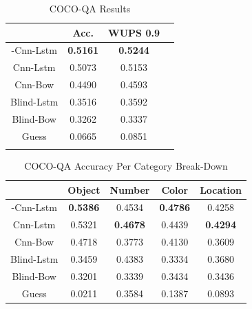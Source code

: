 \documentclass{article}
\renewcommand{\#}[1]{\textbf{#1}}
\begin{document}
\begin{table}[h]
\caption{COCO-QA Results}
\label{tab:cocoqa_results}
\vskip 0.15in
\begin{center}
\begin{small}
\begin{sc}
\begin{tabular}{c c c c}
\hline
\abovespace\belowspace
           & Acc.     & WUPS 0.9 \\
\hline
\abovespace
2-Cnn-Lstm &\#{0.5161}&\#{0.5244}\\
Cnn-Lstm   & 0.5073   & 0.5153   \\
Cnn-Bow    & 0.4490   & 0.4593   \\
Blind-Lstm & 0.3516   & 0.3592   \\
Blind-Bow  & 0.3262   & 0.3337   \\
\belowspace
Guess      & 0.0665   & 0.0851   \\
\hline
\abovespace
\end{tabular}
\end{sc}
\end{small}
\end{center}
\end{table}

\begin{table}[h]
\caption{COCO-QA Accuracy Per Category Break-Down}
\label{tab:cocoqa_acc_breakdown}
\vskip 0.15in
\begin{center}
\begin{small}
\begin{sc}
\begin{tabular}{c c c c c}
\hline
\abovespace\belowspace
           & Object    & Number   & Color    & Location \\
\hline
\abovespace
2-Cnn-Lstm & \#{0.5386}& 0.4534   &\#{0.4786}& 0.4258   \\
Cnn-Lstm   & 0.5321    &\#{0.4678}& 0.4439   &\#{0.4294}\\
Cnn-Bow    & 0.4718    & 0.3773   & 0.4130   & 0.3609   \\
Blind-Lstm & 0.3459    & 0.4383   & 0.3334   & 0.3680   \\
Blind-Bow  & 0.3201    & 0.3339   & 0.3434   & 0.3436   \\
\belowspace
Guess      & 0.0211    & 0.3584   & 0.1387   & 0.0893   \\
\hline
\end{tabular}
\end{sc}
\end{small}
\end{center}
\end{table}
\end{document}
